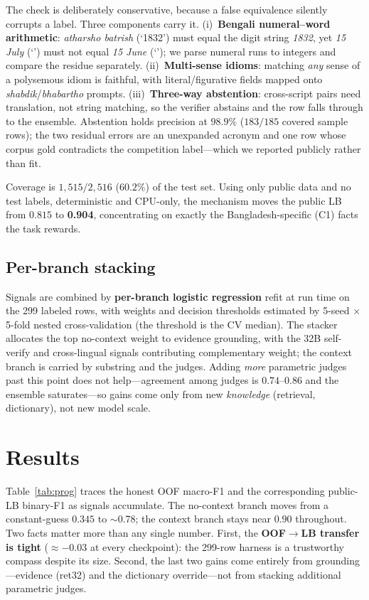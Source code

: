 \documentclass[11pt]{article}
\newcommand{\bn}[2]{\emph{#1} (`#2')}   %
\begin{document}
The check is deliberately conservative, because a false equivalence silently
corrupts a label. Three components carry it. (i)~\textbf{Bengali numeral--word
arithmetic}: \bn{atharsho batrish}{1832} must equal the digit string
\emph{1832}, yet \bn{15 July}{} must not equal \bn{15 June}{}; we parse numeral
runs to integers and compare the residue separately. (ii)~\textbf{Multi-sense
idioms}: matching \emph{any} sense of a polysemous idiom is faithful, with
literal/figurative fields mapped onto \emph{shabdik}/\emph{bhabartho} prompts.
(iii)~\textbf{Three-way abstention}: cross-script pairs need translation, not
string matching, so the verifier abstains and the row falls through to the
ensemble. Abstention holds precision at $98.9\%$ ($183/185$ covered sample
rows); the two residual errors are an unexpanded acronym and one row whose
corpus gold contradicts the competition label---which we reported publicly
rather than fit.

Coverage is $1{,}515/2{,}516$ ($60.2\%$) of the test set. Using only public data
and no test labels, deterministic and CPU-only, the mechanism moves the public
LB from $0.815$ to \textbf{0.904}, concentrating on exactly the
Bangladesh-specific (C1) facts the task rewards.

\subsection{Per-branch stacking}
\label{sec:stack}
Signals are combined by \textbf{per-branch logistic regression} refit at run
time on the 299 labeled rows, with weights and decision thresholds estimated by
5-seed $\times$ 5-fold nested cross-validation (the threshold is the CV median).
The stacker allocates the top no-context weight to evidence grounding, with the
32B self-verify and cross-lingual signals contributing complementary weight;
the context branch is carried by substring and the judges. Adding
\emph{more} parametric judges past this point does not help---agreement among
judges is $0.74$--$0.86$ and the ensemble saturates---so gains come only from
new \emph{knowledge} (retrieval, dictionary), not new model scale.

\section{Results}
\label{sec:results}
Table~\ref{tab:prog} traces the honest OOF macro-F1 and the corresponding
public-LB binary-F1 as signals accumulate. The no-context branch moves from a
constant-guess $0.345$ to $\sim$0.78; the context branch stays near $0.90$
throughout. Two facts matter more than any single number. First, the
\textbf{OOF$\rightarrow$LB transfer is tight} ($\approx-0.03$ at every checkpoint):
the 299-row harness is a trustworthy compass despite its size. Second, the last
two gains come entirely from grounding---evidence (ret32) and the dictionary
override---not from stacking additional parametric judges.
\end{document}
